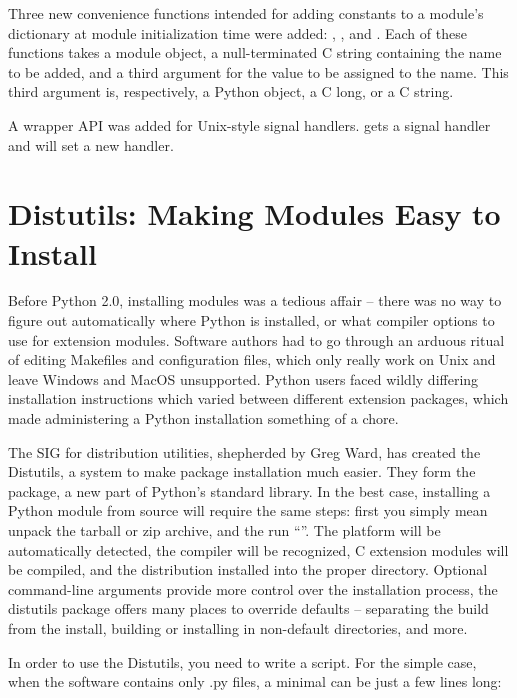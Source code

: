 \documentclass{howto}
\begin{document}
Three new convenience functions intended for adding constants to a
module's dictionary at module initialization time were added:
, ,
and .  Each of these functions
takes a module object, a null-terminated C string containing the name
to be added, and a third argument for the value to be assigned to the
name.  This third argument is, respectively, a Python object, a C
long, or a C string.

A wrapper API was added for Unix-style signal handlers.
 gets a signal handler and
 will set a new handler.

\section{Distutils: Making Modules Easy to Install}

Before Python 2.0, installing modules was a tedious affair -- there
was no way to figure out automatically where Python is installed, or
what compiler options to use for extension modules.  Software authors
had to go through an arduous ritual of editing Makefiles and
configuration files, which only really work on Unix and leave Windows
and MacOS unsupported.  Python users faced wildly differing
installation instructions which varied between different extension
packages, which made administering a Python installation something of 
a chore.

The SIG for distribution utilities, shepherded by Greg Ward, has
created the Distutils, a system to make package installation much
easier.  They form the  package, a new part of
Python's standard library. In the best case, installing a Python
module from source will require the same steps: first you simply mean
unpack the tarball or zip archive, and the run ``''.  The platform will be automatically detected, the compiler
will be recognized, C extension modules will be compiled, and the
distribution installed into the proper directory.  Optional
command-line arguments provide more control over the installation
process, the distutils package offers many places to override defaults
-- separating the build from the install, building or installing in
non-default directories, and more.

In order to use the Distutils, you need to write a 
script.  For the simple case, when the software contains only .py
files, a minimal  can be just a few lines long:
\end{document}
